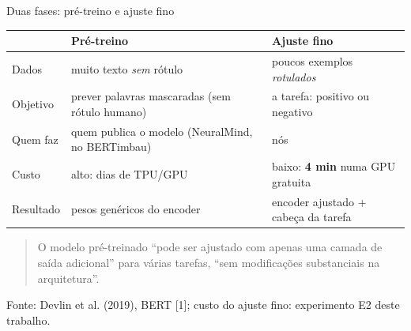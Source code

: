 \documentclass[aspectratio=169,10pt]{beamer}
\newcommand{\fonte}[1]{\par\vfill{\scriptsize\color{tinta2}Fonte: #1}}
\newcommand{\destaque}[1]{{\color{azul}\bfseries #1}}
\begin{document}
\begin{frame}{Duas fases: pré-treino e ajuste fino}
  \centering
  \begin{tabular}{@{}L{0.13\textwidth}L{0.41\textwidth}L{0.38\textwidth}@{}}
    \toprule
    & \textbf{Pré-treino} & \textbf{Ajuste fino} \\
    \midrule
    Dados & muito texto \emph{sem} rótulo & poucos exemplos \emph{rotulados} \\
    Objetivo & prever palavras mascaradas (sem rótulo humano) & a tarefa: positivo ou negativo \\
    Quem faz & quem publica o modelo (NeuralMind, no BERTimbau) & nós \\
    Custo & alto: dias de TPU/GPU & baixo: \destaque{4 min} numa GPU gratuita \\
    Resultado & pesos genéricos do encoder & encoder ajustado + cabeça da tarefa \\
    \bottomrule
  \end{tabular}
  \vspace{1em}

  \begin{quote}
    \small O modelo pré-treinado ``pode ser ajustado com apenas uma camada de saída adicional'' para várias tarefas, ``sem modificações substanciais na arquitetura''.
  \end{quote}
  \fonte{Devlin et al. (2019), BERT [1]; custo do ajuste fino: experimento E2 deste trabalho.}
\end{frame}
\end{document}
